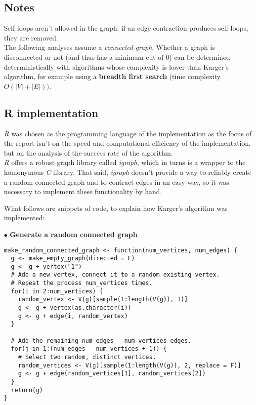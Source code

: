 \documentclass[
12pt,
a4paper,
oneside,
headinclude,
footinclude]{article}
\begin{document}
\subsection{Notes}
\vspace{-5mm}
Self loops aren't allowed in the graph: if an edge contraction produces self loops, they are removed. \\
The following analyses assume a \textit{connected graph}. Whether a graph is disconnected or not (and thus has a minimum cut of $0$) can be determined deterministically
with algorithms whose complexity is lower than Karger's algorithm, for example using a \textbf{breadth first search} (time complexity $O(|V| + |E|))$.

\subsection{R implementation}
\textit{R} was chosen as the programming language of the implementation as the focus of the report isn't on the speed and computational efficiency of the implementation,
but on the analysis of the success rate of the algorithm. \\
\textit{R} offers a robust graph library called \textit{igraph}, which in turns is a wrapper to the homonymous \textit{C} library.
That said, \textit{igraph} doesn't provide a way to reliably create a random connected graph and to contract edges in an easy way,
so it was necessary to implement these functionality by hand.


What follows are snippets of code, to explain how Karger's algorithm was implemented:


$\bullet$ \textbf{Generate a random connected graph}

\begin{lstlisting}
make_random_connected_graph <- function(num_vertices, num_edges) {
  g <- make_empty_graph(directed = F)
  g <- g + vertex("1")
  # Add a new vertex, connect it to a random existing vertex.
  # Repeat the process num_vertices times.
  for(i in 2:num_vertices) {
    random_vertex <- V(g)[sample(1:length(V(g)), 1)]
    g <- g + vertex(as.character(i))
    g <- g + edge(i, random_vertex)
  }

  # Add the remaining num_edges - num_vertices edges.
  for(j in 1:(num_edges - num_vertices + 1)) {
    # Select two random, distinct vertices.
    random_vertices <- V(g)[sample(1:length(V(g)), 2, replace = F)]
    g <- g + edge(random_vertices[1], random_vertices[2])
  }
  return(g)
}
\end{lstlisting}
\end{document}
